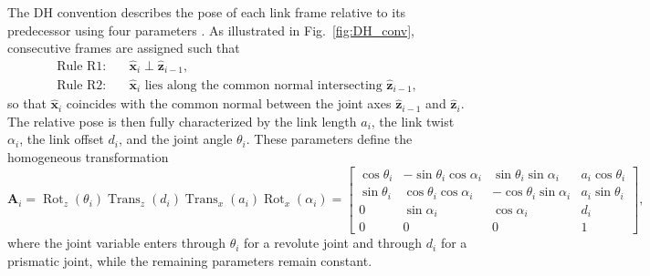 \documentclass[fleqn,10pt]{article}
\begin{document}
The DH convention describes the pose of each link frame relative to its predecessor using four parameters  \cite{craig2005introduction, spong2020robot}. As illustrated in Fig.~\ref{fig:DH_conv}, consecutive frames are assigned such that
\begin{align}
	\text{Rule R1:} \quad &\hat{\bm{x}}_{i} \perp \hat{\bm{z}}_{i-1}, \label{eq:rule_r1} \\
	\text{Rule R2:} \quad &\hat{\bm{x}}_{i} \text{ lies along the common normal intersecting } \hat{\bm{z}}_{i-1}, \label{eq:rule_r2}
\end{align}
so that $\hat{\bm{x}}_i$ coincides with the common normal between the joint axes $\hat{\bm{z}}_{i-1}$ and $\hat{\bm{z}}_i$. The relative pose is then fully characterized by the link length $a_i$, the link twist $\alpha_i$, the link offset $d_i$, and the joint angle $\theta_i$. These parameters define the homogeneous transformation
\begin{equation}
	\bm{A}_i = \operatorname{Rot}_z(\theta_i)\operatorname{Trans}_z(d_i)\operatorname{Trans}_x(a_i)\operatorname{Rot}_x(\alpha_i) = \begin{bmatrix}
		\cos\theta_i & -\sin\theta_i\cos\alpha_i & \sin\theta_i\sin\alpha_i & a_i\cos\theta_i \\
		\sin\theta_i & \cos\theta_i\cos\alpha_i & -\cos\theta_i\sin\alpha_i & a_i\sin\theta_i \\
		0 & \sin\alpha_i & \cos\alpha_i & d_i \\
		0 & 0 & 0 & 1
	\end{bmatrix},
	\label{eq:dh_matrix}
\end{equation}
where the joint variable enters through $\theta_i$ for a revolute joint and through $d_i$ for a prismatic joint, while the remaining parameters remain constant.
\end{document}

